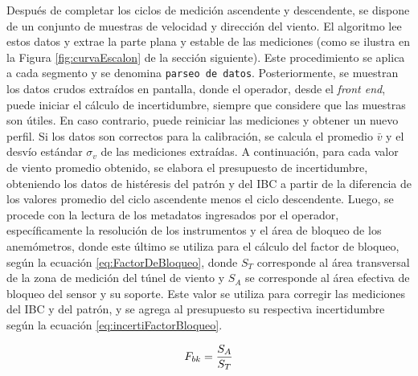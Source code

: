 Después de completar los ciclos de medición ascendente y descendente, se dispone de un conjunto de muestras de velocidad y dirección del viento. El algoritmo lee estos datos y extrae la parte plana y estable de las mediciones (como se ilustra en la Figura \ref{fig:curvaEscalon} de la sección siguiente). Este procedimiento se aplica a cada segmento y se denomina \texttt{parseo de datos}. Posteriormente, se muestran los datos crudos extraídos en pantalla, donde el operador, desde el \textit{front end}, puede iniciar el cálculo de incertidumbre, siempre que considere que las muestras son útiles. En caso contrario, puede reiniciar las mediciones y obtener un nuevo perfil. Si los datos son correctos para la calibración, se calcula el promedio $\bar{v}$ y el desvío estándar $\sigma_{v}$ de las mediciones extraídas. A continuación, para cada valor de viento promedio obtenido, se elabora el presupuesto de incertidumbre, obteniendo los datos de histéresis del patrón y del IBC a partir de la diferencia de los valores promedio del ciclo ascendente menos el ciclo descendente. Luego, se procede con la lectura de los metadatos ingresados por el operador, específicamente la resolución de los instrumentos y el área de bloqueo de los anemómetros, donde este último se utiliza para el cálculo del factor de bloqueo, según la ecuación \ref{eq:FactorDeBloqueo}, donde $S_{T}$ corresponde al área transversal de la zona de medición del túnel de viento y $S_{A}$ se corresponde al área efectiva de bloqueo del sensor y su soporte. Este valor se utiliza para corregir las mediciones del IBC y del patrón, y se agrega al presupuesto su respectiva incertidumbre según la ecuación \ref{eq:incertiFactorBloqueo}.


\begin{equation}
    \centering
    F_{bk}= \frac{S_{A} }{S_{T}}
    \label{eq:FactorDeBloqueo}
\end{equation}

